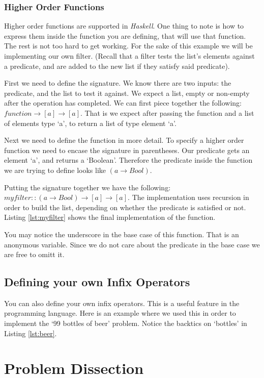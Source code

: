 

\subsubsection{Higher Order Functions}

Higher order functions are supported in \textit{Haskell}. One thing to note is
how to express them inside the function you are defining, that will use that
function. The rest is not too hard to get working. For the sake of this example
we will be implementing our own filter. (Recall that a filter tests the list's
elements against a predicate, and are added to the new list if they satisfy
said predicate).

First we need to define the signature. We know there are two inputs: the
predicate, and the list to test it against. We expect a list, empty or
non-empty after the operation has completed. We can first piece together the
following: $ function \rightarrow [a] \rightarrow [a] $. That is we expect
after passing the function and a list of elements type `a', to return a list of
type element `a'. 

Next we need to define the function in more detail. To specify a higher order
function we need to encase the signature in parentheses. Our predicate gets an
element `a', and returns a `Boolean'. Therefore the predicate inside the function
we are trying to define looks like $(a \rightarrow Bool)$.

Putting the signature together we have the following: $myfilter :: (a
\rightarrow Bool) \rightarrow [a] \rightarrow [a]$. The implementation uses
recursion in order to build the list, depending on whether the predicate is
satisfied or not. Listing \ref{lst:myfilter} shows the final implementation of
the function.


You may notice the underscore in the base case of this function. That is an
anonymous variable. Since we do not care about the predicate in the base case
we are free to omitt it.

\subsection{Defining your own Infix Operators}

You can also define your own infix operators. This is a useful feature in the
programming language. Here is an example where we used this in order to
implement the `99 bottles of beer' problem. Notice the backtics on `bottles' in
Listing \ref{lst:beer}.


\section{Problem Dissection}

